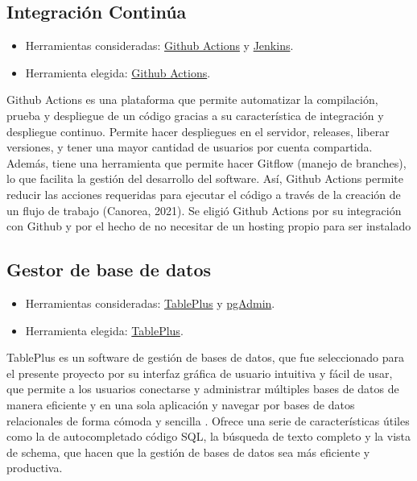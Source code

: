 \subsection{Integración Continúa}
\begin{itemize}
\tightlist
\item
  Herramientas consideradas:
  \href{https://www.sonarsource.com/products/sonarqube/}{Github Actions} y 
  \href{https://circleci.com/)}{Jenkins}.
\item
  Herramienta elegida: \href{https://www.sonarsource.com/products/sonarqube/}{Github Actions}.
\end{itemize}
Github Actions es una plataforma que permite automatizar la compilación, prueba y despliegue de un código gracias a su característica de integración y despliegue continuo. Permite hacer despliegues en el servidor, releases, liberar versiones, y tener una mayor cantidad de usuarios por cuenta compartida. Además, tiene una herramienta que permite hacer Gitflow (manejo de branches), lo que facilita la gestión del desarrollo del software. Así, Github Actions permite reducir las acciones requeridas para ejecutar el código a través de la creación de un flujo de trabajo (Canorea, 2021). Se eligió Github Actions por su integración con Github y por el hecho de no necesitar de un hosting propio para ser instalado \cite{art:github_actions}

\subsection{Gestor de base de datos}
\begin{itemize}
\tightlist
\item
  Herramientas consideradas:
  \href{https://tableplus.com/}{TablePlus} y 
  \href{https://www.pgadmin.org/)}{pgAdmin}.
\item
  Herramienta elegida: \href{https://tableplus.com/}{TablePlus}.
\end{itemize}
TablePlus es un software de gestión de bases de datos, que fue seleccionado para el presente proyecto por su interfaz gráfica de usuario intuitiva y fácil de usar, que permite a los usuarios conectarse y administrar múltiples bases de datos de manera eficiente y en una sola aplicación y navegar por bases de datos relacionales de forma cómoda y sencilla \cite{art:tableplus}. Ofrece una serie de características útiles como la de autocompletado código SQL, la búsqueda de texto completo y la vista de schema, que hacen que la gestión de bases de datos sea más eficiente y productiva.

